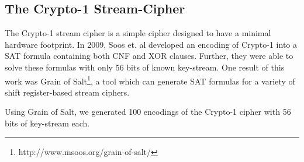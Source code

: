 \subsection{The Crypto-1 Stream-Cipher}
\label{sec:encoding:crypto1}

The Crypto-1 stream cipher is a simple cipher designed to have a minimal hardware footprint. In 2009, Soos et. al \cite{SNC09} developed an encoding of Crypto-1 into a SAT formula containing both CNF and XOR clauses. Further, they were able to solve these formulas with only 56 bits of known key-stream. One result of this work was Grain of Salt\footnote{http://www.msoos.org/grain-of-salt/}, a tool which can generate SAT formulas for a variety of shift register-based stream ciphers.

Using Grain of Salt, we generated 100 encodings of the Crypto-1 cipher with 56 bits of key-stream each.
